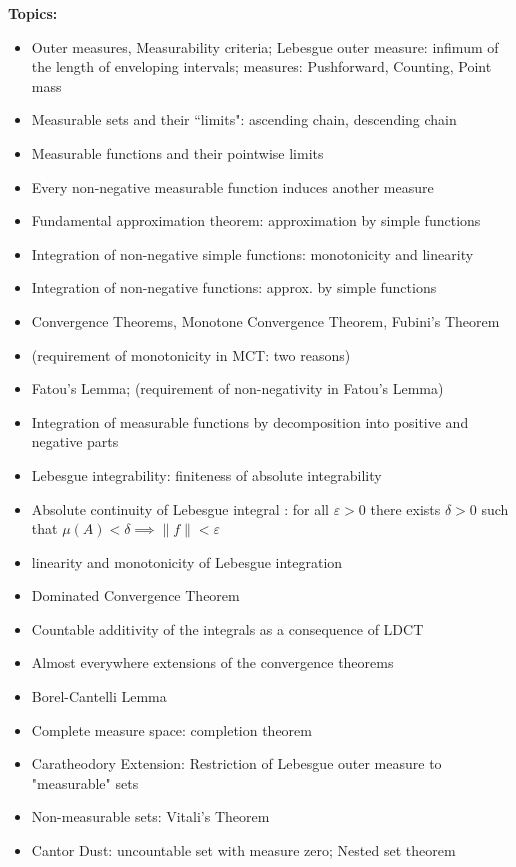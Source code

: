 \documentclass[12pt]{article}
\author{Nutan Nepal}
\begin{document}
\textbf{Topics:}
\vspace*{2mm}
\begin{itemize}
    \item Outer measures, Measurability criteria; Lebesgue outer measure: infimum of the length of enveloping intervals; measures: Pushforward, Counting, Point mass
    \item Measurable sets and their ``limits": ascending chain, descending chain
    \item Measurable functions and their pointwise limits
    \item Every non-negative measurable function induces another measure
    \item Fundamental approximation theorem: approximation by simple functions
    \item Integration of non-negative simple functions: monotonicity and linearity
    \item Integration of non-negative functions: approx. by simple functions
    \item Convergence Theorems, Monotone Convergence Theorem, Fubini's Theorem
    \item (requirement of monotonicity in MCT: two reasons)
    \item Fatou's Lemma; (requirement of non-negativity in Fatou's Lemma)

    \item Integration of measurable functions by decomposition into positive and negative parts
    \item Lebesgue integrability: finiteness of absolute integrability
    \item Absolute continuity of Lebesgue integral : for all $\varepsilon>0$ there exists $\delta>0$ such that $\mu(A)<\delta\implies \|f\|<\varepsilon$
    \item linearity and monotonicity of Lebesgue integration
    \item Dominated Convergence Theorem
    \item Countable additivity of the integrals as a consequence of LDCT
    \item Almost everywhere extensions of the convergence theorems
    \item Borel-Cantelli Lemma
    \item Complete measure space: completion theorem
    \item Caratheodory Extension: Restriction of Lebesgue outer measure to "measurable" sets
    \item Non-measurable sets: Vitali's Theorem
    \item Cantor Dust: uncountable set with measure zero; Nested set theorem


\end{itemize}
\end{document}

